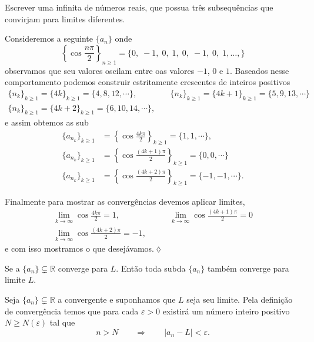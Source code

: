 \begin{exer}
Escrever uma \seq infinita de n\'{u}meros reais, que possua tr\^{e}s
subsequ\^{e}ncias que convirjam para limites diferentes.
\end{exer}

\solo Consideremos a seguinte \seq $\{a_n\}$ onde
\begin{equation*}
   \left \{ \cos\frac{n\pi}{2}\right\}_{n\geq 1}=\{0,\;-1,\;0,\;1,\; 0,\; -1,\; 0,\; 1,\ldots,  \}
\end{equation*}
observamos que seu valores oscilam entre oas valores $-1$, $0$ e
$1$. Baseados nesse comportamento podemos construir \seqs
estritamente crescentes de inteiros positivos
\begin{align*}
\{n_{k}\}_{k\geq 1}=\{4k\}_{k\geq 1}=\{4,8,12,\cdots \},&\quad
\{n_{k}\}_{k\geq 1}=\{4k+1\}_{k\geq 1}=\{5,9,13,\cdots \}\\[2ex]
\{n_{k}\}_{k\geq 1}=\{4k+2\}_{k\geq 1}=\{6,10,14,\cdots \},&\
\end{align*}
e assim obtemos  as sub\seqs
\begin{align*}
\{a_{n_k}\}_{k\geq 1}&=\left \{ \cos\frac{4k\pi}{2}\right\}_{k\geq
1}=\{1,1,\cdots\},\\[2ex]
 \{a_{n_k}\}_{k\geq 1}&=\left \{
\cos\frac{(4k+1)\pi}{2}\right\}_{k\geq 1}=\{0,0,\cdots\}\\[2ex]
\{a_{n_k}\}_{k\geq 1}&=\left \{
\cos\frac{(4k+2)\pi}{2}\right\}_{k\geq 1}=\{-1,-1,\cdots\}.
\end{align*}

Finalmente para mostrar as converg\^{e}ncias devemos aplicar limites,
\begin{align*}
    \lim_{k\to\infty}\cos\frac{4k\pi}{2}=1,&\qquad
    \lim_{k\to\infty}\cos\frac{(4k+1)\pi}{2}=0\\[2ex]
\lim_{k\to\infty}\cos\frac{(4k+2)\pi}{2}=-1,&
\end{align*}
e com isso mostramos o que desejávamos.\hfill \(\lozenge\)

\begin{fteo}\label{subseq001}
Se a \seq $\{a_n\}\subsetneq \mathbb{R}$ converge para $L$. Ent\~{a}o toda sub\seq da \seq
$\{a_n\}$ tamb\'{e}m converge para limite $L$.
\end{fteo}

\prova Seja $\{a_n\}\subsetneq \mathbb{R}$ a \seq convergente e
suponhamos que $L$ seja seu limite. Pela defini\c{c}\~{a}o de converg\^{e}ncia
temos que para cada $\varepsilon>0$ existir\'{a} um n\'{u}mero inteiro positivo
$N\geq N(\varepsilon)$ tal que
\begin{equation*}
    n>N\qquad \Rightarrow\qquad |a_n-L|<\varepsilon.
\end{equation*}


